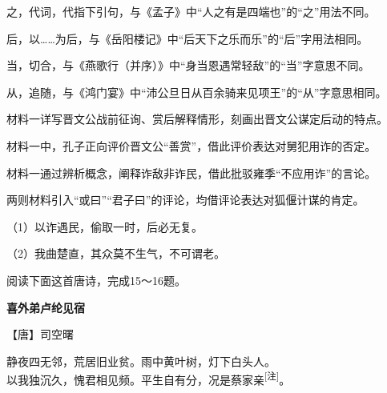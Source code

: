 \documentclass[11pt,a4paper]{ctexart}
\begin{document}


\begin{choices}
\item 之，代词，代指下引句，与《孟子》中“人之有是四端也”的“之”用法不同。
\item 后，以……为后，与《岳阳楼记》中“后天下之乐而乐”的“后”字用法相同。
\item 当，切合，与《燕歌行（并序）》中“身当恩遇常轻敌”的“当”字意思不同。
\item 从，追随，与《鸿门宴》中“沛公旦日从百余骑来见项王”的“从”字意思相同。
\end{choices}

\begin{choices}
\item 材料一详写晋文公战前征询、赏后解释情形，刻画出晋文公谋定后动的特点。
\item 材料一中，孔子正向评价晋文公“善赏”，借此评价表达对舅犯用诈的否定。
\item 材料一通过辨析概念，阐释诈敌非诈民，借此批驳雍季“不应用诈”的言论。
\item 两则材料引入“或曰”“君子曰”的评论，均借评论表达对狐偃计谋的肯定。
\end{choices}


（1）以诈遇民，偷取一时，后必无复。

（2）我曲楚直，其众莫不生气，不可谓老。


\par\vspace{2.2em}

阅读下面这首唐诗，完成15～16题。

\begin{center}{\bfseries 喜外弟卢纶见宿}\par\vspace{0.15em}【唐】司空曙\end{center}

\begin{poem}
静夜四无邻，荒居旧业贫。雨中黄叶树，灯下白头人。\\
以我独沉久，愧君相见频。平生自有分，况是蔡家亲\textsuperscript{[注]}。
\end{poem}
\end{document}
